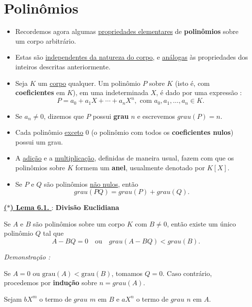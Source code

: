 \section{Polinômios}

    \begin{itemize}[left=0.5cm, align=left, nosep]
        \item Recordemos agora algumas \underline{propriedades elementares} de \textbf{polinômios} sobre um corpo arbitrário.  
        \item Estas são \underline{independentes da natureza do corpo}, e \underline{análogas} às propriedades dos inteiros descritas anteriormente.  
        \item Seja $K$ um \underline{corpo} qualquer. Um polinômio $P$ sobre $K$ (isto é, com \textbf{coeficientes} em $K$), em uma indeterminada $X$, é dado por uma expressão : 
        \[
            P = a_0 + a_1 X + \cdots + a_n X^n, \text{ com $a_0, a_1, \ldots, a_n \in K$. }
        \]
        \item Se $a_n \neq 0$, dizemos que $P$ possui \textbf{grau} $n$ e escrevemos $grau(P) = n$.  
        \item Cada polinômio \underline{exceto} $0$ (o polinômio com todos os \textbf{coeficientes nulos}) possui um grau.  
        \item A \underline{adição} e a \underline{multiplicação}, definidas de maneira usual, fazem com que os polinômios sobre $K$ formem um \textbf{anel}, usualmente denotado por $K[X]$.  
        \item Se $P$ e $Q$ são polinômios \underline{não nulos}, então
        \[
            \boxed{grau(PQ) = grau(P) + grau(Q)}.
        \]
    
    \end{itemize}

    \underline{\underline{ \textbf{\textcolor{cinzaEscuro}{($\ast$) Lema 6.1.}} }} : \textbf{\textcolor{cinzaEscuro}{Divisão Euclidiana}}

        Se $A$ e $B$ são polinômios sobre um corpo $K$ com $B \neq 0$, então existe um único polinômio $Q$ tal que 
        \[
        \boxed{A - BQ = 0} \quad \text{ou} \quad \boxed{grau(A - BQ) < grau(B)}.
        \]

        \noindent\textit{Demonstração : }

        Se $A = 0$ ou $\text{grau}(A) < \text{grau}(B)$, tomamos $Q = 0$.  
        Caso contrário, procedemos por \textbf{indução} sobre $n = grau(A)$.  

        Sejam $bX^m$ o termo de $grau$ $m$ em $B$ e $aX^n$ o termo de $grau$ $n$ em $A$.  

